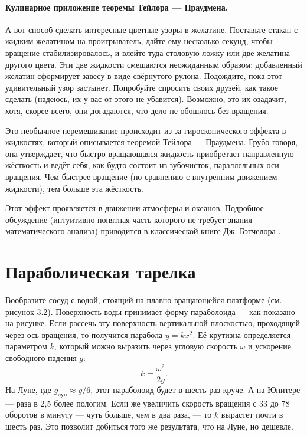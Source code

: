 \paragraph{Кулинарное приложение теоремы Тейлора --- Праудмена.}
А вот способ сделать интересные цветные узоры в желатине.
Поставьте стакан с жидким желатином на проигрыватель, дайте ему несколько секунд, чтобы вращение стабилизировалось, и влейте туда столовую ложку или две желатина другого цвета.
Эти две жидкости смешаются неожиданным образом: добавленный желатин сформирует завесу в виде свёрнутого рулона.
Подождите, пока этот удивительный узор застынет.
Попробуйте спросить своих друзей, как такое сделать (надеюсь, их у вас от этого не убавится).
Возможно, это их озадачит, хотя, скорее всего, они догадаются, что дело не обошлось без вращения.

Это необычное перемешивание происходит из-за гироскопического эффекта в жидкостях, который описывается теоремой Тейлора --- Праудмена.
Грубо говоря, она утверждает, что быстро вращающаяся жидкость приобретает направленную жёсткость и ведёт себя, как будто состоит из зубочисток, параллельных оси вращения.
Чем быстрее вращение (по сравнению с внутренним движением жидкости), тем больше эта жёсткость.

Этот эффект проявляется в движении атмосферы и океанов.
Подробное обсуждение (интуитивно понятная часть которого не требует знания математического анализа) приводится в классической книге Дж. Бэтчелора \cite{batchelor1967}.

\section{Параболическая тарелка}


Вообразите сосуд с водой, стоящий на плавно вращающейся платформе (см. рисунок 3.2).
Поверхность воды принимает форму параболоида --- как показано на рисунке.
Если рассечь эту поверхность вертикальной плоскостью, проходящей через ось вращения, то получится парабола $y=kx^2$.
Её крутизна определяется параметром $k$, который можно выразить через угловую скорость $\omega$ и ускорение свободного падения $g$:
\begin{equation}
k=\frac{\omega^2}{2g}.
\label{eq:3.1}
\end{equation}
На Луне, где $g_{\text{лун}} \approx g/6$, этот параболоид будет в шесть раз круче.
А на Юпитере --- раза в 2{,}5 более пологим.
Если же увеличить скорость вращения с 33 до 78 оборотов в минуту --- чуть больше, чем в два раза, --- то $k$ вырастет почти в шесть раз.
Это позволит добиться того же результата, что на Луне, но дешевле.

